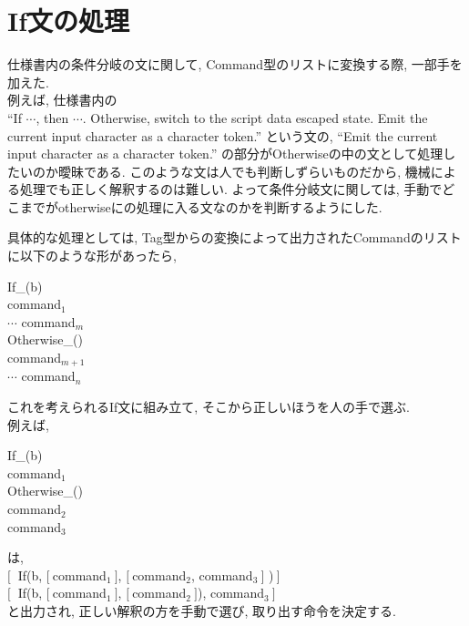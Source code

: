 \documentclass[uplatex,a4j]{jsreport}
\begin{document}
\section{If文の処理}
仕様書内の条件分岐の文に関して, Command型のリストに変換する際, 一部手を加えた.\\
例えば, 仕様書内の\\
``If $\cdots$, then $\cdots$. Otherwise, switch to the script data escaped state. Emit the current input character as a character token.''
という文の, ``Emit the current input character as a character token.'' の部分がOtherwiseの中の文として処理したいのか曖昧である. 
このような文は人でも判断しずらいものだから, 機械による処理でも正しく解釈するのは難しい.
よって条件分岐文に関しては, 手動でどこまでがotherwiseにの処理に入る文なのかを判断するようにした. 

具体的な処理としては, 
Tag型からの変換によって出力されたCommandのリストに以下のような形があったら, 
\begin{screen}
      If_(b)\\
      command$_1$\\
      $\cdots$
      command$_m$\\
      Otherwise_()\\
      command$_{m+1}$\\
      $\cdots$
      command$_n$
\end{screen}
これを考えられるIf文に組み立て, そこから正しいほうを人の手で選ぶ. \\
例えば, 
\begin{screen}
      If_(b)\\
      command$_1$\\
      Otherwise_()\\
      command$_2$\\
      command$_3$
\end{screen}
は, \\
$[\ $ If(b, $[\ $command$_1 \ ]$, $[\ $command$_2$, command$_3 \ ]$ )$\ ]$\\
$[\ $ If(b, $[\ $command$_1 \ ]$, $[\ $command$_2 \ ]$), command$_3 \ ]$ \\
と出力され, 正しい解釈の方を手動で選び, 取り出す命令を決定する.

\end{document}

